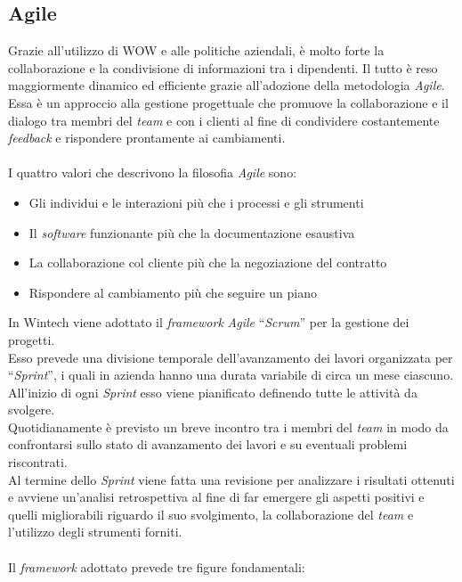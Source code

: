 \subsection{Agile}
Grazie all'utilizzo di \gls{WOW} e alle politiche aziendali, è molto forte la collaborazione e la condivisione di informazioni tra i dipendenti. Il tutto è reso maggiormente dinamico ed efficiente grazie all'adozione della metodologia \emph{Agile}.\\
Essa è un approccio alla gestione progettuale che promuove la collaborazione e il dialogo tra membri del \emph{team} e con i clienti al fine di condividere costantemente \emph{feedback} e rispondere prontamente ai cambiamenti.\\\\
I quattro valori che descrivono la filosofia \emph{Agile} sono:
\begin{itemize}
    \item Gli individui e le interazioni più che i processi e gli strumenti 
    \item Il \emph{software} funzionante più che la documentazione esaustiva  
    \item La collaborazione col cliente più che la negoziazione del contratto 
    \item Rispondere al cambiamento più che seguire un piano\\
\end{itemize}
In Wintech viene adottato il \emph{framework} \emph{Agile} “\emph{Scrum}” per la gestione dei progetti.\\
Esso prevede una divisione temporale dell'avanzamento dei lavori organizzata per “\emph{Sprint}”, i quali in azienda hanno una durata variabile di circa un mese ciascuno.\\
All'inizio di ogni \emph{Sprint} esso viene pianificato definendo tutte le attività da svolgere.\\ 
Quotidianamente è previsto un breve incontro tra i membri del \emph{team} in modo da confrontarsi sullo stato di avanzamento dei lavori e su eventuali problemi riscontrati.\\
Al termine dello \emph{Sprint} viene fatta una revisione per analizzare i risultati ottenuti e avviene un'analisi retrospettiva al fine di far emergere gli aspetti positivi e quelli migliorabili riguardo il suo svolgimento, la collaborazione del \emph{team} e l'utilizzo degli strumenti forniti.\\\\
Il \emph{framework} adottato prevede tre figure fondamentali: 

